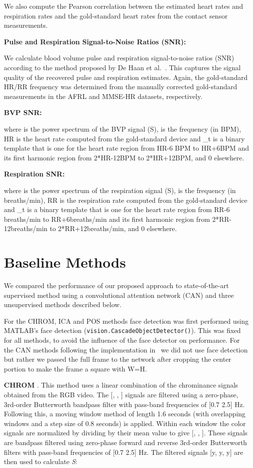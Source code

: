 \documentclass{article}
\begin{document}
We also compute the Pearson correlation between the estimated heart rates and respiration rates and the gold-standard heart rates from the contact sensor measurements.

\textbf{Pulse and Respiration Signal-to-Noise Ratios (SNR):} 

We calculate blood volume pulse and respiration signal-to-noise ratios (SNR) according to the method proposed by De Haan et al.~\citep{de2013robust}. This captures the signal quality of the recovered pulse and respiration estimates. Again, the gold-standard HR/RR frequency was determined from the manually corrected gold-standard measurements in the AFRL and MMSE-HR datasets, respectively.

\textbf{BVP SNR:}

where  is the power spectrum of the BVP signal (S),  is the frequency (in BPM), HR is the heart rate computed from the gold-standard device  and _{t} is a binary template that is one for the heart rate region from HR-6 BPM to HR+6BPM and its first harmonic region from 2*HR-12BPM to 2*HR+12BPM, and 0 elsewhere. 

\textbf{Respiration SNR:}

where  is the power spectrum of the respiration signal (S),  is the frequency (in breaths/min), RR is the respiration rate computed from the gold-standard device and _{t} is a binary template that is one for the heart rate region from RR-6 breaths/min to RR+6breaths/min and its first harmonic region from 2*RR-12breaths/min to 2*RR+12breaths/min, and 0 elsewhere.   


\section{Baseline Methods}
We compared the performance of our proposed approach to state-of-the-art supervised method using a convolutional attention network (CAN) and three unsupervised methods described below.

For the CHROM, ICA and POS methods face detection was first performed using MATLAB's face detection (\texttt{vision.CascadeObjectDetector()}). This was fixed for all methods, to avoid the influence of the face detector on performance. For the CAN methods following the implementation in~\cite{chen2018deepphys} we did not use face detection but rather we passed the full frame to the network after cropping the center portion to make the frame a square with W=H.

\textbf{CHROM} \citep{de2013robust}. This method uses a linear combination of the chrominance signals obtained from the RGB video.  The [, , ] signals are filtered using a zero-phase, 3rd-order Butterworth bandpass filter with pass-band frequencies of [0.7 2.5] Hz. Following this, a moving window method of length 1.6 seconds (with overlapping windows and a step size of 0.8 seconds) is applied. Within each window the color signals are normalized by dividing by their mean value to give [, , ]. These signals are bandpass filtered using zero-phase forward and reverse 3rd-order Butterworth filters with pass-band frequencies of [0.7 2.5] Hz. The filtered signals [y, y, y] are then used to calculate \textit{S}:
\end{document}
